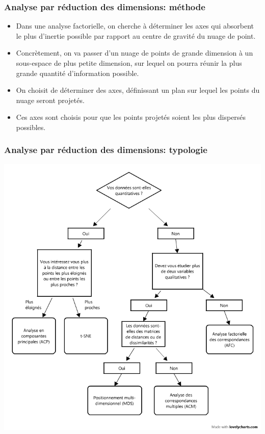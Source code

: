 \documentclass{beamer}
\begin{document}
\begin{frame}[fragile]
\frametitle{Analyse par réduction des dimensions: méthode}



\begin{itemize}
\item Dans une analyse factorielle, on cherche à déterminer les axes qui absorbent le plus d’inertie possible par rapport au centre de gravité du nuage de point.
\item Concrètement, on va passer d'un nuage de points de grande dimension à un sous-espace de plus petite dimension, sur lequel on pourra réunir la plus grande quantité d'information possible. 
\item On choisit de déterminer des axes, définissant un plan sur lequel les points du nuage seront projetés. 
\item Ces axes sont choisis pour que les points projetés soient les plus dispersés possibles.
\end{itemize}
\end{frame}


\begin{frame}[fragile]
\frametitle{Analyse par réduction des dimensions: typologie}

\begin{center}
\centering %
\includegraphics[height=8.2 cm]{img/af.png}
\end{center}

\end{frame}
\end{document}
